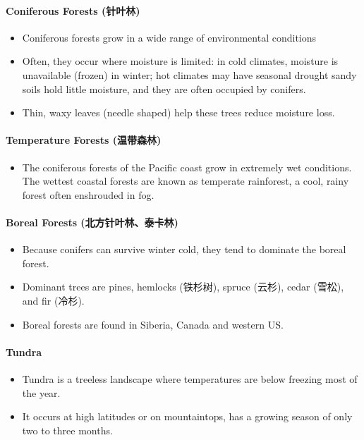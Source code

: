 \documentclass[10pt]{article}
\begin{document}
\paragraph{Coniferous Forests (针叶林)}
\begin{itemize}
    \item Coniferous forests grow in a wide range of environmental conditions
    \item Often, they occur where moisture is limited: in cold climates, moisture is unavailable (frozen) in winter; hot climates may have seasonal drought sandy soils hold little moisture, and they are often occupied by conifers. 
    \item Thin, waxy leaves (needle shaped) help these trees reduce moisture loss. 
\end{itemize}

\paragraph{Temperature Forests (温带森林)}
\begin{itemize}
    \item The coniferous forests of the Pacific coast grow in extremely wet conditions. The wettest coastal forests are known as temperate rainforest, a cool, rainy forest often enshrouded in fog. 
\end{itemize}

\paragraph{Boreal Forests (北方针叶林、泰卡林)}
\begin{itemize}
    \item Because conifers can survive winter cold, they tend to dominate the boreal forest.
    \item Dominant trees are pines, hemlocks (铁杉树), spruce (云杉), cedar (雪松), and fir (冷杉).
    \item Boreal forests are found in Siberia, Canada and western US. 
\end{itemize}

\paragraph{Tundra}
\begin{itemize}
    \item Tundra is a treeless landscape where temperatures are below freezing most of the year. 
    \item It occurs at high latitudes or on mountaintops, has a growing season of only two to three months. 
\end{itemize}
\end{document}
